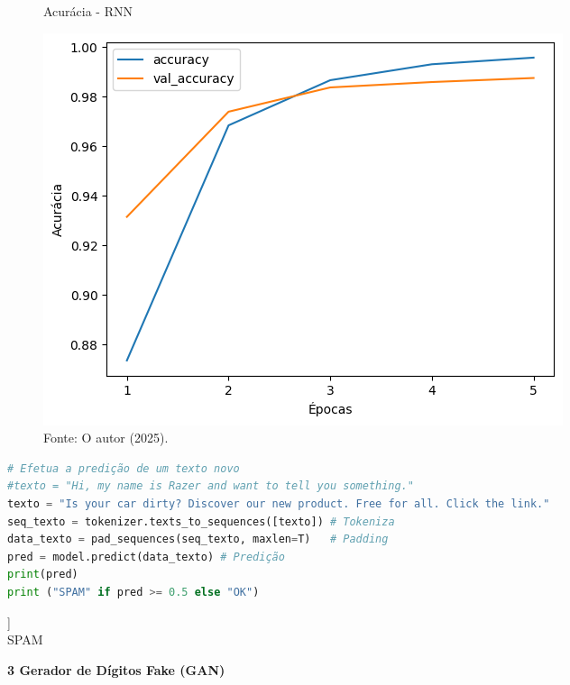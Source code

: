 \begin{figure}[H]
\centering
\caption{Acurácia - RNN}
\includegraphics[width=.8\linewidth]{apendices/fig/9_IAA009_6.png}
\caption*{Fonte: O autor (2025).}
\end{figure}

\begin{lstlisting}[language=Python, style=input]
# Efetua a predição de um texto novo
#texto = "Hi, my name is Razer and want to tell you something."
texto = "Is your car dirty? Discover our new product. Free for all. Click the link."
seq_texto = tokenizer.texts_to_sequences([texto]) # Tokeniza
data_texto = pad_sequences(seq_texto, maxlen=T)   # Padding
pred = model.predict(data_texto) # Predição
print(pred)
print ("SPAM" if pred >= 0.5 else "OK")
\end{lstlisting}

\begin{tcolorbox}[myoutputstyle]
[[0.7768526]]\\
SPAM
\end{tcolorbox}


\begin{adjustwidth}{1em}{}
\textbf{3 Gerador de Dígitos Fake (GAN)}
\end{adjustwidth}

